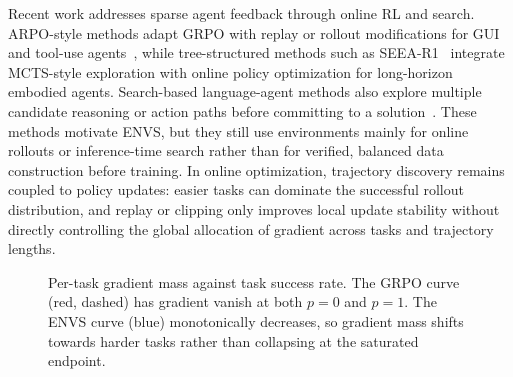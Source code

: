 \documentclass[11pt]{article}
\begin{document}
Recent work addresses sparse agent feedback through online RL and search. ARPO-style methods adapt GRPO with replay or rollout modifications for GUI and tool-use agents~\citep{lu2025arpo_gui,dong2025agentic_arpo,qian2025toolrl,wang2025ragen}, while tree-structured methods such as SEEA-R1~\citep{tian2025seea} integrate MCTS-style exploration with online policy optimization for long-horizon embodied agents. Search-based language-agent methods also explore multiple candidate reasoning or action paths before committing to a solution~\citep{yao2023treeofthoughts,koh2024tree_search_lm_agents,putta2024agentq}. These methods motivate ENVS, but they still use environments mainly for online rollouts or inference-time search rather than for verified, balanced data construction before training. In online optimization, trajectory discovery remains coupled to policy updates: easier tasks can dominate the successful rollout distribution, and replay or clipping only improves local update stability without directly controlling the global allocation of gradient across tasks and trajectory lengths.

\begin{figure}[H]
\centering
{}
\caption{Per-task gradient mass against task success rate. The GRPO
curve (red, dashed) has gradient vanish at both $p = 0$ and $p = 1$. The
\textsc{ENVS} curve (blue) monotonically decreases, so gradient mass shifts towards harder tasks rather than collapsing at the saturated endpoint.}
\label{fig:rl:gradient-curves}
\end{figure}
\end{document}
